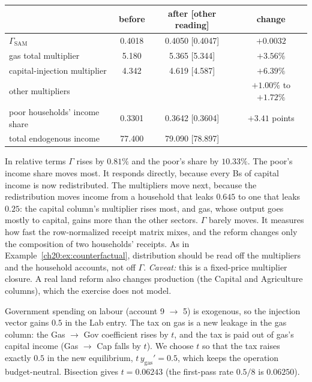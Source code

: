 \documentclass[../solutions_manual.tex]{subfiles}
\begin{document}
\begin{center}\small
\begin{tabular}{lccc}
\toprule
& before & after [other reading] & change \\
\midrule
$\Gamma_{\text{SAM}}$ & 0.4018 & 0.4050 [0.4047] & $+0.0032$ \\
gas total multiplier & 5.180 & 5.365 [5.344] & $+3.56\%$ \\
capital-injection multiplier & 4.342 & 4.619 [4.587] & $+6.39\%$ \\
other multipliers & & & $+1.00\%$ to $+1.72\%$ \\
poor households' income share & 0.3301 & 0.3642 [0.3604] & $+3.41$ points \\
total endogenous income & 77.400 & 79.090 [78.897] & \\
\bottomrule
\end{tabular}
\end{center}

 In relative terms $\Gamma$ rises by $0.81\%$ and the poor's share by $10.33\%$. The poor's income share moves most. It responds directly, because every Bs of capital income is now redistributed. The multipliers move next, because the redistribution moves income from a household that leaks $0.645$ to one that leaks $0.25$: the capital column's multiplier rises most, and gas, whose output goes mostly to capital, gains more than the other sectors. $\Gamma$ barely moves. It measures how fast the row-normalized receipt matrix mixes, and the reform changes only the composition of two households' receipts. As in Example~\ref{ch20:ex:counterfactual}, distribution should be read off the multipliers and the household accounts, not off $\Gamma$. \emph{Caveat:} this is a fixed-price multiplier closure. A real land reform also changes production (the Capital and Agriculture columns), which the exercise does not model.


 Government spending on labour (account 9 $\to$ 5) is exogenous, so the injection vector gains $0.5$ in the Lab entry. The tax on gas is a new leakage in the gas column: the Gas $\to$ Gov coefficient rises by $t$, and the tax is paid out of gas's capital income (Gas $\to$ Cap falls by $t$). We choose $t$ so that the tax raises exactly $0.5$ in the new equilibrium, $t\,y_{\text{gas}}' = 0.5$, which keeps the operation budget-neutral. Bisection gives $t = 0.06243$ (the first-pass rate $0.5/8$ is $0.06250$).
\end{document}

